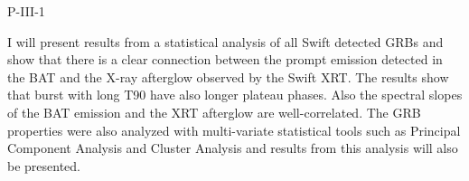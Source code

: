 P-III-1


\bigskip



\bigskip

\noindent I will present results from a statistical analysis of all Swift detected GRBs and show that there is a clear connection between the prompt emission detected in the BAT and the X-ray afterglow observed by the Swift XRT. The results show that burst with long T90 have also longer plateau phases. Also the spectral slopes of the BAT emission and the XRT afterglow are well-correlated. The GRB properties were also analyzed with multi-variate statistical tools such as Principal Component Analysis and Cluster Analysis and results from this analysis will also be presented.

